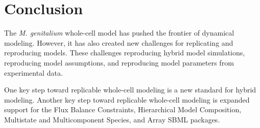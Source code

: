 \documentclass[journal,transmag,twoside]{IEEEtran}
\begin{document}
%






\section{Conclusion}

The \textit{M. genitalium} whole-cell model has pushed the frontier of dynamical modeling. 
However, it has also created new challenges for replicating and reproducing models.
These challenges reproducing hybrid model simulations, reproducing model assumptions, and
reproducing model parameters from experimental data. 

One key step toward replicable whole-cell modeling is a new standard for hybrid modeling.
Another key step toward replicable whole-cell modeling is expanded support for the 
Flux Balance Constraints, Hierarchical Model Composition, Multistate and Multicomponent 
Species, and Array SBML packages. 
\end{document}

